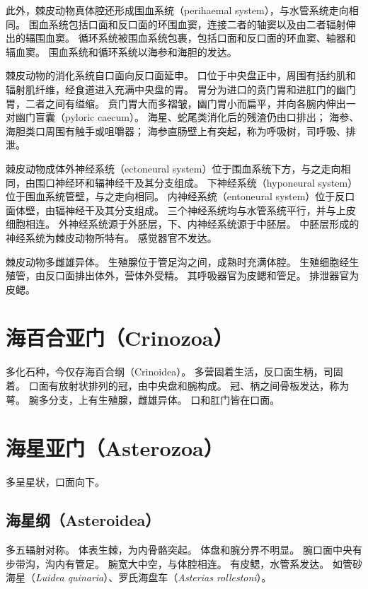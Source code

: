 \documentclass[11pt]{article}
\begin{document}
\newline

此外，棘皮动物真体腔还形成围血系统（perihaemal system），与水管系统走向相同。
围血系统包括口面和反口面的环围血窦，连接二者的轴窦以及由二者辐射伸出的辐围血窦。
循环系统被围血系统包裹，包括口面和反口面的环血窦、轴器和辐血窦。
围血系统和循环系统以海参和海胆的发达。

\newline

棘皮动物的消化系统自口面向反口面延申。
口位于中央盘正中，周围有括约肌和辐射肌纤维，经食道进入充满中央盘的胃。
胃分为进口的贲门胃和进肛门的幽门胃，二者之间有缢缩。
贲门胃大而多褶皱，幽门胃小而扁平，并向各腕内伸出一对幽门盲囊（pyloric caecum）。
海星、蛇尾类消化后的残渣仍由口排出；
海参、海胆类口周围有触手或咀嚼器；
海参直肠壁上有突起，称为呼吸树，司呼吸、排泄。

\newline

棘皮动物成体外神经系统（ectoneural system）位于围血系统下方，与之走向相同，由围口神经环和辐神经干及其分支组成。
下神经系统（hyponeural system）位于围血系统管壁，与之走向相同。
内神经系统（entoneural system）位于反口面体壁，由辐神经干及其分支组成。
三个神经系统均与水管系统平行，并与上皮细胞相连。
外神经系统源于外胚层，下、内神经系统源于中胚层。
中胚层形成的神经系统为棘皮动物所特有。
感觉器官不发达。

\newline

棘皮动物多雌雄异体。
生殖腺位于管足沟之间，成熟时充满体腔。
生殖细胞经生殖管，由反口面排出体外，营体外受精。
其呼吸器官为皮鳃和管足。
排泄器官为皮鳃。
  
\section{海百合亚门（Crinozoa）}
多化石种，今仅存海百合纲（Crinoidea）。
多营固着生活，反口面生柄，司固着。
口面有放射状排列的冠，由中央盘和腕构成。
冠、柄之间骨板发达，称为萼。
腕多分支，上有生殖腺，雌雄异体。
口和肛门皆在口面。
  
\section{海星亚门（Asterozoa）}
多呈星状，口面向下。

\subsection{海星纲（Asteroidea）}
多五辐射对称。
体表生棘，为内骨骼突起。
体盘和腕分界不明显。
腕口面中央有步带沟，沟内有管足。
腕宽大中空，与体腔相连。
有皮鳃，水管系发达。
如管砂海星（\textit{Luidea quinaria}）、罗氏海盘车（\textit{Asterias rollestoni}）。
\end{document}
